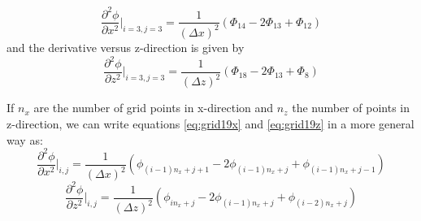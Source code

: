 \begin{equation}
\frac{\partial^2 \phi}{\partial x^2}|_{i=3,j=3}= \frac{1}{(\Delta x)^2}(\Phi_{14}-2\Phi_{13}+\Phi_{12})
\label{eq:grid19x}
\end{equation}
and the derivative versus z-direction is given by
\begin{equation}
\frac{\partial^2 \phi}{\partial z^2}|_{i=3,j=3}= \frac{1}{(\Delta z)^2}(\Phi_{18}-2\Phi_{13}+\Phi_{8})
\label{eq:grid19z}
\end{equation}

If $n_x$ are the number of grid points in x-direction and $n_z$ the number of points in z-direction, we can write equations \ref{eq:grid19x} and \ref{eq:grid19z} in a more general way as:
\begin{equation}
\frac{\partial^2 \phi}{\partial x^2}|_{i,j}= \frac{1}{(\Delta x)^2}(\phi_{(i-1)n_x+j+1}-2\phi_{(i-1)n_x+j}+\phi_{(i-1)n_x+j-1})
\label{eq:gridKx}
\end{equation}
\begin{equation}
\frac{\partial^2 \phi}{\partial z^2}|_{i,j}= \frac{1}{(\Delta z)^2}(\phi_{in_x+j}-2\phi_{(i-1)n_x+j}+\phi_{(i-2)n_x+j})
\label{eq:gridKz}
\end{equation}

